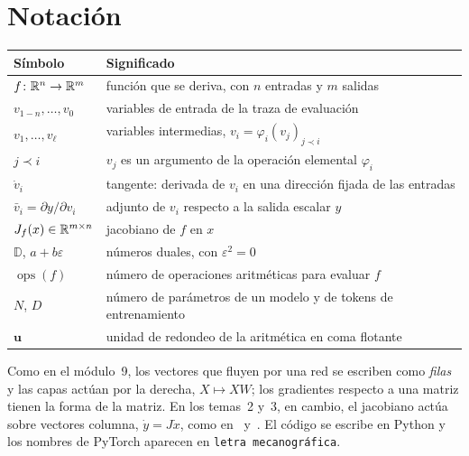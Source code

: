 \documentclass[11pt,a4paper,twoside,openany]{book}
\newcommand{\Du}{\mathbb{D}}
\newcommand{\ops}{\operatorname{ops}}
\newcommand{\pre}{\prec}
\newcommand{\uep}{\mathbf{u}}
\begin{document}
\section*{Notación}
\begin{center}\small
\begin{tabular}{@{}ll@{}}
\toprule
Símbolo & Significado \\
\midrule
$f\colon\mathbb{R}^{n}\to\mathbb{R}^{m}$ & función que se deriva, con $n$ entradas y $m$ salidas \\
$v_{1-n},\dots,v_0$ & variables de entrada de la traza de evaluación \\
$v_1,\dots,v_\ell$ & variables intermedias, $v_i=\varphi_i(v_j)_{j\pre i}$ \\
$j\pre i$ & $v_j$ es un argumento de la operación elemental $\varphi_i$ \\
$\dot v_i$ & tangente: derivada de $v_i$ en una dirección fijada de las entradas \\
$\bar v_i=\partial y/\partial v_i$ & adjunto de $v_i$ respecto a la salida escalar $y$ \\
$J_f(x)\in\mathbb{R}^{m\times n}$ & jacobiano de $f$ en $x$ \\
$\Du$, $a+b\varepsilon$ & números duales, con $\varepsilon^{2}=0$ \\
$\ops(f)$ & número de operaciones aritméticas para evaluar $f$ \\
$N$, $D$ & número de parámetros de un modelo y de tokens de entrenamiento \\
$\uep$ & unidad de redondeo de la aritmética en coma flotante \\
\bottomrule
\end{tabular}
\end{center}

Como en el módulo~9, los vectores que fluyen por una red se escriben como \emph{filas} y las capas actúan por la derecha, $X\mapsto XW$; los gradientes respecto a una matriz tienen la forma de la matriz. En los temas~2 y~3, en cambio, el jacobiano actúa sobre vectores columna, $\dot y=J\dot x$, como en~\cite{baydin} y~\cite{gw}. El código se escribe en Python y los nombres de PyTorch aparecen en \texttt{letra mecanográfica}.


\tableofcontents

\mainmatter







\backmatter

\end{document}
